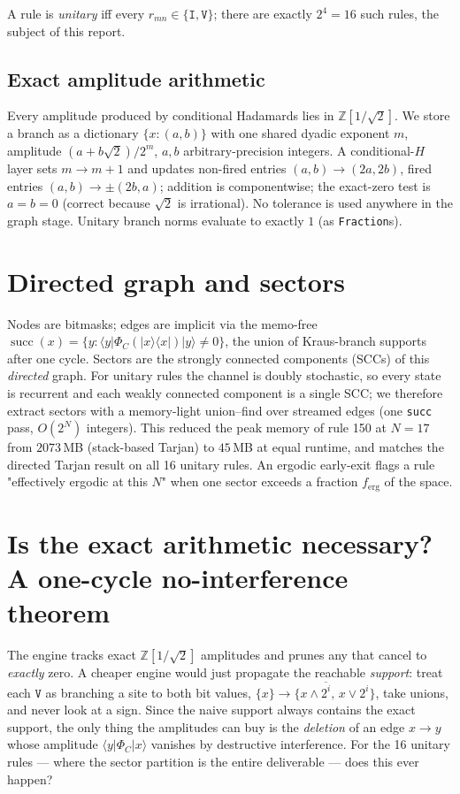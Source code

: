 \documentclass[11pt]{article}
\newcommand{\rt}[1]{\texttt{#1}}
\newcommand{\Zsqrt}{\ensuremath{\mathbb{Z}[1/\sqrt{2}]}}
\begin{document}
A rule is \emph{unitary} iff every $r_{mn}\in\{\rt I,\rt V\}$; there are exactly
$2^4=16$ such rules, the subject of this report.

\subsection{Exact amplitude arithmetic}
Every amplitude produced by conditional Hadamards lies in $\Zsqrt$. We store a
branch as a dictionary $\{x:(a,b)\}$ with one shared dyadic exponent $m$,
amplitude $(a+b\sqrt2)/2^m$, $a,b$ arbitrary-precision integers. A conditional-$H$
layer sets $m\to m+1$ and updates non-fired entries $(a,b)\to(2a,2b)$, fired
entries $(a,b)\to\pm(2b,a)$; addition is componentwise; the exact-zero test is
$a=b=0$ (correct because $\sqrt2$ is irrational). No tolerance is used anywhere
in the graph stage. Unitary branch norms evaluate to exactly $1$ (as \rt{Fraction}s).

\section{Directed graph and sectors}
Nodes are bitmasks; edges are implicit via the memo-free
$\operatorname{succ}(x)=\{y:\langle y|\Phi_C(|x\rangle\!\langle x|)|y\rangle\neq0\}$,
the union of Kraus-branch supports after one cycle. Sectors are the strongly
connected components (SCCs) of this \emph{directed} graph. For unitary rules the
channel is doubly stochastic, so every state is recurrent and each weakly
connected component is a single SCC; we therefore extract sectors with a
memory-light union--find over streamed edges (one \rt{succ} pass, $O(2^N)$
integers). This reduced the peak memory of rule 150 at $N=17$ from
$2073$\,MB (stack-based Tarjan) to $45$\,MB at equal runtime, and matches the
directed Tarjan result on all 16 unitary rules. An ergodic early-exit flags a
rule "effectively ergodic at this $N$" when one sector exceeds a fraction
$f_\mathrm{erg}$ of the space.

\section{Is the exact arithmetic necessary? A one-cycle no-interference theorem}
\label{sec:nointerf}
The engine tracks exact \Zsqrt{} amplitudes and prunes any that cancel to
\emph{exactly} zero. A cheaper engine would just propagate the reachable
\emph{support}: treat each $\rt V$ as branching a site to both bit values,
$\{x\}\to\{x\wedge\overline{2^i},\,x\vee2^i\}$, take unions, and never look at a
sign. Since the naive support always contains the exact support, the only thing
the amplitudes can buy is the \emph{deletion} of an edge $x\to y$ whose amplitude
$\langle y|\Phi_C|x\rangle$ vanishes by destructive interference. For the 16
unitary rules --- where the sector partition is the entire deliverable --- does
this ever happen?
\end{document}
